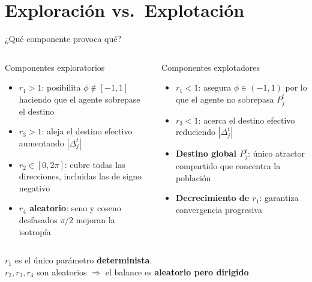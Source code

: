 \documentclass[aspectratio=169, spanish]{beamer}
\begin{document}
\section{Exploración vs.\ Explotación}



\begin{frame}{¿Qué componente provoca qué?}
    \vspace{-0.5cm}
  \begin{columns}[T, onlytextwidth]
      \begin{exampleblock}{Componentes exploratorios}
        \begin{itemize}
          \setlength\itemsep{0.35em}
          \item \textbf{$r_1 > 1$}: posibilita $\phi\notin[-1,1]$ haciendo que el agente sobrepase el destino
          \item \textbf{$r_3 > 1$}: aleja el destino efectivo aumentando $|\Delta_j^t|$
          \item \textbf{$r_2 \in [0,2\pi]$}: cubre todas las direcciones, incluidas las de signo negativo
          \item \textbf{$r_4$ aleatorio}: seno y coseno desfasados $\pi/2$ mejoran la isotropía
        \end{itemize}
      \end{exampleblock}

      \begin{alertblock}{Componentes explotadores}
        \begin{itemize}
          \setlength\itemsep{0.35em}
          \item \textbf{$r_1 < 1$}: asegura $\phi\in(-1,1)$ por lo que el agente no sobrepasa $P_j^t$
          \item \textbf{$r_3 < 1$}: acerca el destino efectivo reduciendo $|\Delta_j^t|$
          \item \textbf{Destino global $P_j^t$}: único atractor compartido que concentra la población
          \item \textbf{Decrecimiento de $r_1$}: garantiza convergencia progresiva
        \end{itemize}
      \end{alertblock}
  \end{columns}

    {\small
    $r_1$ es el único parámetro \textbf{determinista}.\\
    $r_2, r_3, r_4$ son aleatorios $\Rightarrow$ el balance es \textbf{aleatorio pero dirigido}}
\end{frame}
\end{document}
